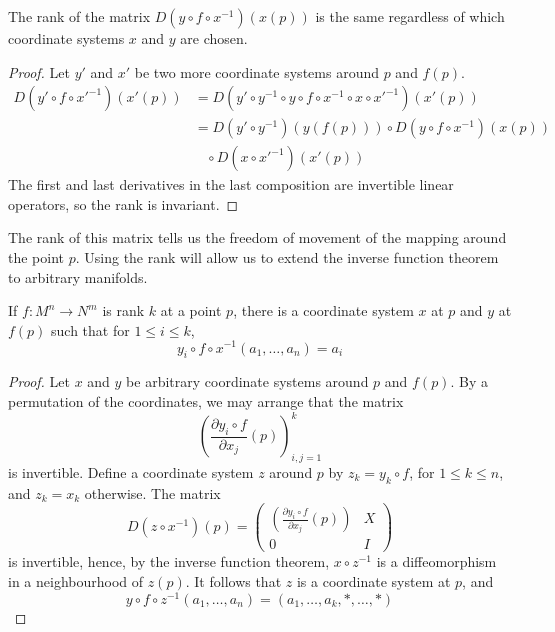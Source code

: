 \begin{theorem}
    The rank of the matrix $D(y \circ f \circ x^{-1})(x(p))$ is the same regardless of which coordinate systems $x$ and $y$ are chosen.
\end{theorem}
\begin{proof}
    Let $y'$ and $x'$ be two more coordinate systems around $p$ and $f(p)$.
    \begin{align*}
        D(y' \circ f \circ x'^{-1})(x'(p)) &= D(y' \circ y^{-1} \circ y \circ f \circ x^{-1} \circ x \circ x'^{-1})(x'(p))\\
        &= D(y' \circ y^{-1})(y(f(p))) \circ D(y \circ f \circ x^{-1})(x(p)) 
        \\ &\ \ \ \ \circ D(x \circ x'^{-1})(x'(p))
    \end{align*}
    The first and last derivatives in the last composition are invertible linear operators, so the rank is invariant.
\end{proof}

The rank of this matrix tells us the freedom of movement of the mapping around the point $p$. Using the rank will allow us to extend the inverse function theorem to arbitrary manifolds.

\begin{theorem}
    If $f:M^n \to N^m$ is rank $k$ at a point $p$, there is a coordinate system $x$ at $p$ and $y$ at $f(p)$ such that for $1 \leq i \leq k$,
    \[ y_i \circ f \circ x^{-1}(a_1, \dots, a_n) = a_i \]
\end{theorem}
\begin{proof}
    Let $x$ and $y$ be arbitrary coordinate systems around $p$ and $f(p)$. By a permutation of the coordinates, we may arrange that the matrix
    \[ \left( \frac{\partial y_i \circ f}{\partial x_j}(p) \right)_{i,j = 1}^k \]
    is invertible. Define a coordinate system $z$ around $p$ by $z_k = y_k \circ f$, for $1 \leq k \leq n$, and $z_k = x_k$ otherwise. The matrix
    \[ D(z \circ x^{-1})(p) = \begin{pmatrix} \left( \frac{\partial y_i \circ f}{\partial x_j}(p) \right) & X \\ 0 & I \end{pmatrix} \]
    is invertible, hence, by the inverse function theorem, $x \circ z^{-1}$ is a diffeomorphism in a neighbourhood of $z(p)$. It follows that $z$ is a coordinate system at $p$, and
    \[ y \circ f \circ z^{-1}(a_1, \dots, a_n) = (a_1, \dots, a_k, *, \dots, *) \]
\end{proof}

